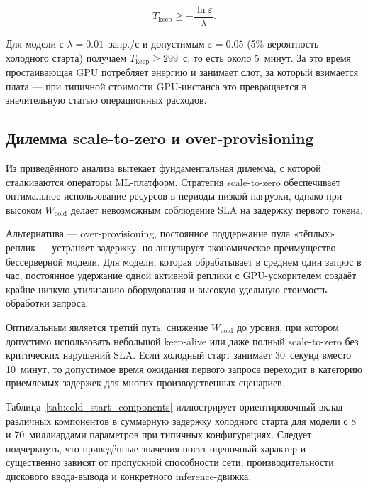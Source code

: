 \begin{equation}
T_{\mathrm{keep}} \geq -\frac{\ln \varepsilon}{\lambda}.
\label{eq:keep_alive}
\end{equation}

Для модели с $\lambda = 0.01$~запр./с и допустимым $\varepsilon = 0.05$ (5\% вероятность холодного старта) получаем $T_{\mathrm{keep}} \geq 299$~с, то есть около 5~минут. За это время простаивающая GPU потребляет энергию и занимает слот, за который взимается плата --- при типичной стоимости GPU-инстанса это превращается в значительную статью операционных расходов.

\subsection{Дилемма scale-to-zero и over-provisioning}

Из приведённого анализа вытекает фундаментальная дилемма, с которой сталкиваются операторы ML-платформ. Стратегия scale-to-zero обеспечивает оптимальное использование ресурсов в периоды низкой нагрузки, однако при высоком $W_{\mathrm{cold}}$ делает невозможным соблюдение SLA на задержку первого токена.

Альтернатива --- over-provisioning, постоянное поддержание пула «тёплых» реплик --- устраняет задержку, но аннулирует экономическое преимущество бессерверной модели. Для модели, которая обрабатывает в среднем один запрос в час, постоянное удержание одной активной реплики с GPU-ускорителем создаёт крайне низкую утилизацию оборудования и высокую удельную стоимость обработки запроса.

Оптимальным является третий путь: снижение $W_{\mathrm{cold}}$ до уровня, при котором допустимо использовать небольшой keep-alive или даже полный scale-to-zero без критических нарушений SLA. Если холодный старт занимает 30~секунд вместо 10~минут, то допустимое время ожидания первого запроса переходит в категорию приемлемых задержек для многих производственных сценариев.

Таблица~\ref{tab:cold_start_components} иллюстрирует ориентировочный вклад различных компонентов в суммарную задержку холодного старта для модели с 8 и 70~миллиардами параметров при типичных конфигурациях. Следует подчеркнуть, что приведённые значения носят оценочный характер и существенно зависят от пропускной способности сети, производительности дискового ввода-вывода и конкретного inference-движка.

